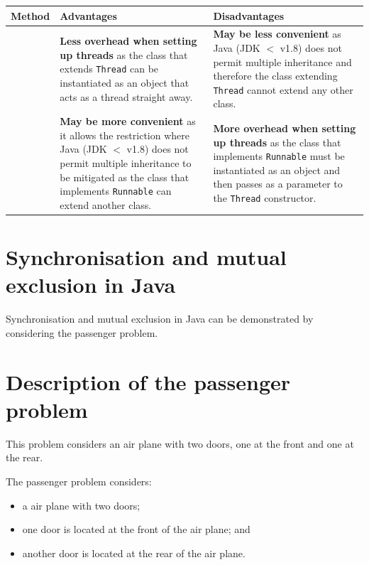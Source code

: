 \documentclass[a4paper]{systems-software}
\begin{document}
\begin{longtabu} to \textwidth {|X[0.85,c]|X[2,l]|X[2,l]|}
	\hline
	\textbf{Method} & \textbf{Advantages} & \textbf{Disadvantages}
	\\ \hline
	& \textbf{Less overhead when setting up threads} as the class that extends \texttt{Thread} can be instantiated as an object that acts as a thread straight away.
	& \textbf{May be less convenient} as Java (JDK $<$ v1.8) does not permit multiple inheritance and therefore the class extending \texttt{Thread} cannot extend any other class.
	\\ \hline
	& \textbf{May be more convenient} as it allows the restriction where Java (JDK $<$ v1.8) does not permit multiple inheritance to be mitigated as the class that implements \texttt{Runnable} can extend another class. & \textbf{More overhead when setting up threads} as the class that implements \texttt{Runnable} must be instantiated as an object and then passes as a parameter to the \texttt{Thread} constructor.
	\\ \hline
\end{longtabu}


\section{Synchronisation and mutual exclusion in Java}

Synchronisation and mutual exclusion in Java can be demonstrated by considering the passenger problem.

\section*{Description of the passenger problem}

This problem considers an air plane with two doors, one at the front and one at the rear.

The passenger problem considers:
\begin{itemize}
	\item a air plane with two doors;
	\item one door is located at the front of the air plane; and
	\item another door is located at the rear of the air plane.
\end{itemize}
\end{document}
